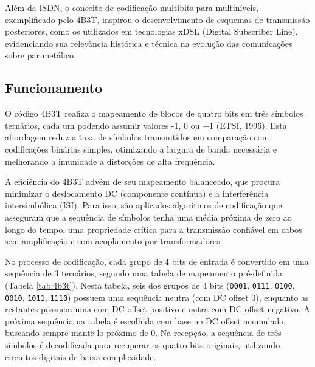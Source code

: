\documentclass[conference]{IEEEtran}
\begin{document}
Além da ISDN, o conceito de codificação multibits-para-multiníveis, exemplificado pelo 4B3T, inspirou o desenvolvimento de esquemas de transmissão posteriores, como os utilizados em tecnologias xDSL (Digital Subscriber Line), evidenciando sua relevância histórica e técnica na evolução das comunicações sobre par metálico.

\subsection{Funcionamento}

O código 4B3T realiza o mapeamento de blocos de quatro bits em três símbolos ternários, cada um podendo assumir valores -1, 0 ou +1 (ETSI, 1996). Esta abordagem reduz a taxa de símbolos transmitidos em comparação com codificações binárias simples, otimizando a largura de banda necessária e melhorando a imunidade a distorções de alta frequência.

A eficiência do 4B3T advém de seu mapeamento balanceado, que procura minimizar o deslocamento DC (componente contínua) e a interferência intersimbólica (ISI). Para isso, são aplicados algoritmos de codificação que asseguram que a sequência de símbolos tenha uma média próxima de zero ao longo do tempo, uma propriedade crítica para a transmissão confiável em cabos sem amplificação e com acoplamento por transformadores.

No processo de codificação, cada grupo de 4 bits de entrada é convertido em uma sequência de 3 ternários, segundo uma tabela de mapeamento pré-definida (Tabela \ref{tab:4b3t}). Nesta tabela, seis dos grupos de 4 bits (\texttt{0001}, \texttt{0111}, \texttt{0100}, \texttt{0010}, \texttt{1011}, \texttt{1110}) possuem uma sequência neutra (com DC offset 0), enquanto as restantes possuem uma com DC offset positivo e outra com DC offset negativo. A próxima sequência na tabela é escolhida com base no DC offset acumulado, buscando sempre mantê-lo próximo de 0. Na recepção, a sequência de três símbolos é decodificada para recuperar os quatro bits originais, utilizando circuitos digitais de baixa complexidade.
\end{document}

